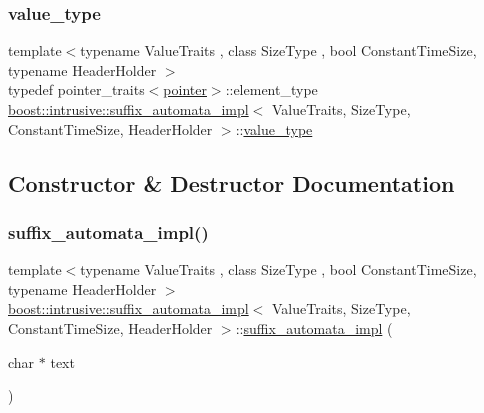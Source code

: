 \subsubsection{\texorpdfstring{value\+\_\+type}{value\_type}}
{\footnotesize\ttfamily template$<$typename Value\+Traits , class Size\+Type , bool Constant\+Time\+Size, typename Header\+Holder $>$ \\
typedef pointer\+\_\+traits$<$\hyperlink{classboost_1_1intrusive_1_1suffix__automata__impl_aa30039fa797b95a84660985ab506f6ef}{pointer}$>$\+::element\+\_\+type \hyperlink{classboost_1_1intrusive_1_1suffix__automata__impl}{boost\+::intrusive\+::suffix\+\_\+automata\+\_\+impl}$<$ Value\+Traits, Size\+Type, Constant\+Time\+Size, Header\+Holder $>$\+::\hyperlink{classboost_1_1intrusive_1_1suffix__automata__impl_afc35e3e13adbae16ac9bfb049d719cd2}{value\+\_\+type}}



\subsection{Constructor \& Destructor Documentation}
\mbox{\label{classboost_1_1intrusive_1_1suffix__automata__impl_af726049e346e9b927b3ef5b4b4cf1ca4}} 
\subsubsection{\texorpdfstring{suffix\+\_\+automata\+\_\+impl()}{suffix\_automata\_impl()}}
{\footnotesize\ttfamily template$<$typename Value\+Traits , class Size\+Type , bool Constant\+Time\+Size, typename Header\+Holder $>$ \\
\hyperlink{classboost_1_1intrusive_1_1suffix__automata__impl}{boost\+::intrusive\+::suffix\+\_\+automata\+\_\+impl}$<$ Value\+Traits, Size\+Type, Constant\+Time\+Size, Header\+Holder $>$\+::\hyperlink{classboost_1_1intrusive_1_1suffix__automata__impl}{suffix\+\_\+automata\+\_\+impl} (\begin{DoxyParamCaption}\item[{char $\ast$}]{text }\end{DoxyParamCaption})\hspace{0.3cm}{\ttfamily [inline]}}


